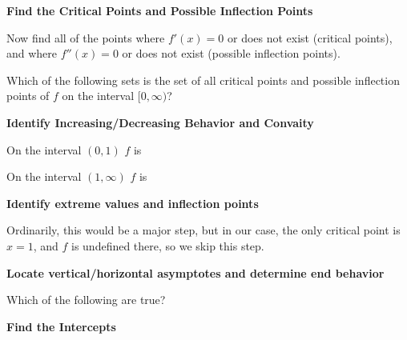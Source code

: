 \documentclass{ximera}
\begin{document}
\begin{question}
 \textbf{Find the Critical Points and Possible Inflection Points}
 
 \begin{solution}
	Now find all of the points where $f'(x)=0$ or does not exist (critical points), and where $f''(x)=0$ or does not exist (possible inflection points).
	
	Which of the following sets is the set of all critical points and possible inflection points of $f$ on the interval $[0,\infty)$?
	
	 \begin{multipleChoice}
    \end{multipleChoice}

 \end{solution}
 
 \textbf{Identify Increasing/Decreasing Behavior and Convaity}
 
 \begin{solution}
 On the interval $(0,1)$ $f$ is
 
 \begin{multipleChoice}
    \end{multipleChoice}
    
  On the interval $(1,\infty)$ $f$ is
 
  \begin{multipleChoice}
    \end{multipleChoice}
    \end{solution}
    
 \textbf{Identify extreme values and inflection points}
 
 Ordinarily, this would be a major step, but in our case, the only critical point is $x=1$, and $f$ is undefined there, so we skip this step.
 
 \textbf{Locate vertical/horizontal asymptotes and determine end behavior}
 
 \begin{solution}
 Which of the following are true?
 
 \begin{multipleChoice}
    \end{multipleChoice}
    \end{solution}
  \textbf{Find the Intercepts}
  

\end{question}
\end{document}
